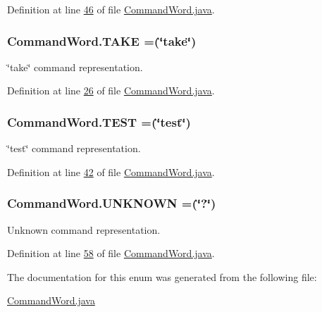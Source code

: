 Definition at line \hyperlink{CommandWord_8java_source_l00046}{46} of file \hyperlink{CommandWord_8java_source}{Command\-Word.\-java}.

\hypertarget{enumCommandWord_ac113629c0d6a8ebe3f4050a50d904a17}{
\subsubsection[{T\-A\-K\-E}]{\setlength{\rightskip}{0pt plus 5cm}Command\-Word.\-T\-A\-K\-E =(\char`\"{}take\char`\"{})}}\label{enumCommandWord_ac113629c0d6a8ebe3f4050a50d904a17}


\char`\"{}take\char`\"{} command representation. 



Definition at line \hyperlink{CommandWord_8java_source_l00026}{26} of file \hyperlink{CommandWord_8java_source}{Command\-Word.\-java}.

\hypertarget{enumCommandWord_a12071308fc3289269d190f8fe5dd95b4}{
\subsubsection[{T\-E\-S\-T}]{\setlength{\rightskip}{0pt plus 5cm}Command\-Word.\-T\-E\-S\-T =(\char`\"{}test\char`\"{})}}\label{enumCommandWord_a12071308fc3289269d190f8fe5dd95b4}


\char`\"{}test\char`\"{} command representation. 



Definition at line \hyperlink{CommandWord_8java_source_l00042}{42} of file \hyperlink{CommandWord_8java_source}{Command\-Word.\-java}.

\hypertarget{enumCommandWord_a7fac6077f2157eb151a67206fd39c3b9}{
\subsubsection[{U\-N\-K\-N\-O\-W\-N}]{\setlength{\rightskip}{0pt plus 5cm}Command\-Word.\-U\-N\-K\-N\-O\-W\-N =(\char`\"{}?\char`\"{})}}\label{enumCommandWord_a7fac6077f2157eb151a67206fd39c3b9}


Unknown command representation. 



Definition at line \hyperlink{CommandWord_8java_source_l00058}{58} of file \hyperlink{CommandWord_8java_source}{Command\-Word.\-java}.



The documentation for this enum was generated from the following file\-:\begin{DoxyCompactItemize}
\item 
\hyperlink{CommandWord_8java}{Command\-Word.\-java}\end{DoxyCompactItemize}

